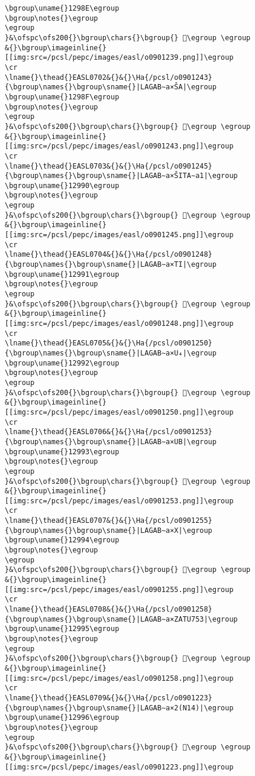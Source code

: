 \begin{verbatim}
\bgroup\uname{}1298E\egroup
\bgroup\notes{}\egroup
\egroup
}&\ofspc\ofs200{}\bgroup\chars{}\bgroup{} 𒦎\egroup \egroup
&{}\bgroup\imageinline{}[[img:src=/pcsl/pepc/images/easl/o0901239.png]]\egroup
\cr
\lname{}\thead{}EASL0702&{}&{}\Ha{/pcsl/o0901243}{\bgroup\names{}\bgroup\sname{}|LAGAB∼a×ŠA|\egroup
\bgroup\uname{}1298F\egroup
\bgroup\notes{}\egroup
\egroup
}&\ofspc\ofs200{}\bgroup\chars{}\bgroup{} 𒦏\egroup \egroup
&{}\bgroup\imageinline{}[[img:src=/pcsl/pepc/images/easl/o0901243.png]]\egroup
\cr
\lname{}\thead{}EASL0703&{}&{}\Ha{/pcsl/o0901245}{\bgroup\names{}\bgroup\sname{}|LAGAB∼a×ŠITA∼a1|\egroup
\bgroup\uname{}12990\egroup
\bgroup\notes{}\egroup
\egroup
}&\ofspc\ofs200{}\bgroup\chars{}\bgroup{} 𒦐\egroup \egroup
&{}\bgroup\imageinline{}[[img:src=/pcsl/pepc/images/easl/o0901245.png]]\egroup
\cr
\lname{}\thead{}EASL0704&{}&{}\Ha{/pcsl/o0901248}{\bgroup\names{}\bgroup\sname{}|LAGAB∼a×TI|\egroup
\bgroup\uname{}12991\egroup
\bgroup\notes{}\egroup
\egroup
}&\ofspc\ofs200{}\bgroup\chars{}\bgroup{} 𒦑\egroup \egroup
&{}\bgroup\imageinline{}[[img:src=/pcsl/pepc/images/easl/o0901248.png]]\egroup
\cr
\lname{}\thead{}EASL0705&{}&{}\Ha{/pcsl/o0901250}{\bgroup\names{}\bgroup\sname{}|LAGAB∼a×U₄|\egroup
\bgroup\uname{}12992\egroup
\bgroup\notes{}\egroup
\egroup
}&\ofspc\ofs200{}\bgroup\chars{}\bgroup{} 𒦒\egroup \egroup
&{}\bgroup\imageinline{}[[img:src=/pcsl/pepc/images/easl/o0901250.png]]\egroup
\cr
\lname{}\thead{}EASL0706&{}&{}\Ha{/pcsl/o0901253}{\bgroup\names{}\bgroup\sname{}|LAGAB∼a×UB|\egroup
\bgroup\uname{}12993\egroup
\bgroup\notes{}\egroup
\egroup
}&\ofspc\ofs200{}\bgroup\chars{}\bgroup{} 𒦓\egroup \egroup
&{}\bgroup\imageinline{}[[img:src=/pcsl/pepc/images/easl/o0901253.png]]\egroup
\cr
\lname{}\thead{}EASL0707&{}&{}\Ha{/pcsl/o0901255}{\bgroup\names{}\bgroup\sname{}|LAGAB∼a×X|\egroup
\bgroup\uname{}12994\egroup
\bgroup\notes{}\egroup
\egroup
}&\ofspc\ofs200{}\bgroup\chars{}\bgroup{} 𒦔\egroup \egroup
&{}\bgroup\imageinline{}[[img:src=/pcsl/pepc/images/easl/o0901255.png]]\egroup
\cr
\lname{}\thead{}EASL0708&{}&{}\Ha{/pcsl/o0901258}{\bgroup\names{}\bgroup\sname{}|LAGAB∼a×ZATU753|\egroup
\bgroup\uname{}12995\egroup
\bgroup\notes{}\egroup
\egroup
}&\ofspc\ofs200{}\bgroup\chars{}\bgroup{} 𒦕\egroup \egroup
&{}\bgroup\imageinline{}[[img:src=/pcsl/pepc/images/easl/o0901258.png]]\egroup
\cr
\lname{}\thead{}EASL0709&{}&{}\Ha{/pcsl/o0901223}{\bgroup\names{}\bgroup\sname{}|LAGAB∼a×2(N14)|\egroup
\bgroup\uname{}12996\egroup
\bgroup\notes{}\egroup
\egroup
}&\ofspc\ofs200{}\bgroup\chars{}\bgroup{} 𒦖\egroup \egroup
&{}\bgroup\imageinline{}[[img:src=/pcsl/pepc/images/easl/o0901223.png]]\egroup

\end{verbatim}

